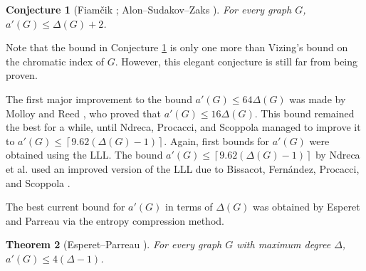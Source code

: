 \documentclass[10pt]{article}
\numberwithin{equation}{subsection}
\newtheorem{theo}{Theorem}[section]
\newtheorem{conj}[theo]{Conjecture}
\theoremstyle{definition}
\begin{document}
	\begin{conj}[Fiam\v{c}ik \cite{Fiamcik}; Alon--Sudakov--Zaks \cite{Alon2}]\label{conj:AECC}
		For every graph $G$, $a'(G) \leq \Delta(G)+2$.
	\end{conj}
	
	Note that the bound in Conjecture \ref{conj:AECC} is only one more than Vizing's bound on the chromatic index of $G$. However, this elegant conjecture is still far from being proven.
	
	The first major improvement to the bound $a'(G)\leq 64 \Delta(G)$ was made by Molloy and Reed \cite{Molloy}, who proved that $a'(G) \leq 16 \Delta(G)$. This bound remained the best for a while, until Ndreca, Procacci, and Scoppola \cite{Ndreca} managed to improve it to $a'(G)\leq \left\lceil 9.62(\Delta(G)-1)\right\rceil$. Again, first bounds for $a'(G)$ were obtained using the LLL. The bound $a'(G)\leq \left\lceil 9.62(\Delta(G)-1)\right\rceil$ by Ndreca et al. used an improved version of the LLL due to Bissacot, Fern\'{a}ndez, Procacci, and Scoppola \cite{Bissacot}.
	
	The best current bound for $a'(G)$ in terms of $\Delta(G)$ was obtained by Esperet and Parreau via the entropy compression method.
	\begin{theo}[Esperet--Parreau \cite{Esperet}]\label{theo:acyclic}
		For every graph $G$ with maximum degree $\Delta$, $a'(G) \leq 4(\Delta-1)$.
	\end{theo}
	
\end{document}
